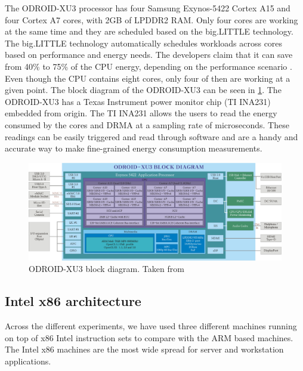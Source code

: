 The ODROID-XU3 processor has four Samsung Exynos-5422 Cortex A15 and four Cortex A7 cores,
with 2GB of LPDDR2 RAM. Only four cores are working at the same time and they are 
scheduled based on the big.LITTLE technology. The big.LITTLE technology
\cite{biglittle} automatically schedules workloads across cores based on
performance and energy needs. The developers claim that it can save from 40\% to 
75\% of the CPU energy, depending on the performance scenario \cite{biglittle}.
Even though the CPU contains eight cores, only four of then are working at a
given point. The block diagram of the ODROID-XU3 can be seen in 
\ref{fig:odroidxu3-diagram}.
The ODROID-XU3 has a Texas Instrument power monitor chip (TI INA231) embedded
from origin. The TI INA231 allows the users to read the energy consumed by the 
cores and DRMA at a 
sampling rate of microseconds. These readings can be easily triggered and read
through software and are a handy and accurate way to make fine-grained energy
consumption measurements.



\vspace{5mm}

\begin{figure}[h!]
  \centering
    \includegraphics[width=\textwidth]{"img/odroidxu3-diagram"}
    \caption{ODROID-XU3 block diagram. Taken from \cite{ODROID_XU3}}
    \label{fig:odroidxu3-diagram}
\end{figure}

\vspace{5mm}



\subsection{Intel x86 architecture}

Across the different experiments, we have used three different machines running
on top of x86 Intel instruction sets to
compare with the ARM based machines. The Intel x86 machines are the most wide
spread for server and workstation applications.
 


